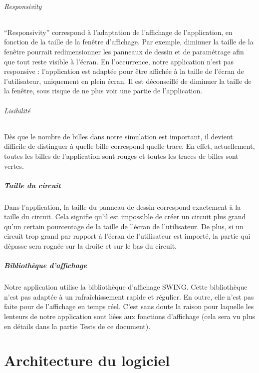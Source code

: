 \documentclass{report}
\begin{document}
\subparagraph{Responsivity}

“Responsivity” correspond à l’adaptation de l’affichage de l’application, en fonction de la taille de la fenêtre d’affichage. Par exemple, diminuer la taille de la fenêtre pourrait redimensionner les panneaux de dessin et de paramétrage afin que tout reste visible à l’écran.
En l'occurrence, notre application n’est pas responsive : l’application est adaptée pour être affichée à la taille de l’écran de l’utilisateur, uniquement en plein écran. Il est déconseillé de diminuer la taille de la fenêtre, sous risque de ne plus voir une partie de l’application.

\subparagraph{Lisibilité}

Dès que le nombre de billes dans notre simulation est important, il devient difficile de distinguer à quelle bille correspond quelle trace. En effet, actuellement, toutes les billes de l’application sont rouges et toutes les traces de billes sont vertes.

\paragraph{Taille du circuit}

Dans l’application, la taille du panneau de dessin correspond exactement à la taille du circuit. Cela signifie qu’il est impossible de créer un circuit plus grand qu’un certain pourcentage de la taille de l’écran de l’utilisateur.
De plus, si un circuit trop grand par rapport à l’écran de l’utilisateur est importé, la partie qui dépasse sera rognée sur la droite et sur le bas du circuit.

\paragraph{Bibliothèque d'affichage}

Notre application utilise la bibliothèque d’affichage SWING. Cette bibliothèque n’est pas adaptée à un rafraîchissement rapide et régulier. En outre, elle n’est pas faite pour de l’affichage en temps réel. C’est sans doute la raison pour laquelle les lenteurs de notre application sont liées aux fonctions d’affichage (cela sera vu plus en détails dans la partie Tests de ce document).

\chapter{Architecture du logiciel}
\end{document}
